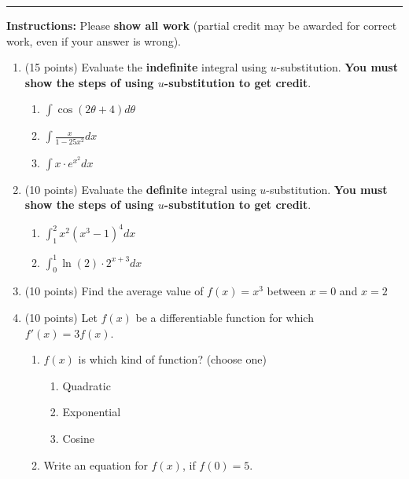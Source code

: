 \documentclass[11pt]{article}
\begin{document}
\Large


\medskip\hrule
\vspace{10pt}

\noindent \textbf{Instructions:} Please \textbf{show all work} (partial credit may be awarded for correct work, even if your answer is wrong). 

\begin{enumerate}

\item (15 points) Evaluate the \textbf{indefinite} integral using $u$-substitution. \textbf{You must show the steps of using $u$-substitution to get credit}.
\begin{enumerate}[itemsep=60pt]
    \item $\displaystyle \int \cos(2\theta+4) d\theta$
    \item $\displaystyle \int  \frac{x}{1-25x^2} dx$
    \item $\displaystyle \int x \cdot e^{x^2} dx$
\end{enumerate}

\vspace{70pt}

\item (10 points) Evaluate the \textbf{definite} integral using $u$-substitution. \textbf{You must show the steps of using $u$-substitution to get credit}.
\begin{enumerate}[itemsep=60pt]
    \item $\displaystyle \int_{1}^{2} x^2 (x^3 - 1)^4 dx$
    \item $\displaystyle \int_{0}^{1} \ln(2) \cdot 2^{x+3} dx$
\end{enumerate}

\newpage

\item (10 points) Find the average value of $f(x) = x^3$ between $x=0$ and $x=2$
\vspace{100pt}

\item (10 points) Let $f(x)$ be a differentiable function for which $f'(x)=3f(x)$.
\begin{enumerate}
    \item $f(x)$ is which kind of function? (choose one)
\begin{enumerate}
    \item Quadratic
    \item Exponential
    \item Cosine
\end{enumerate}
    \item Write an equation for $f(x)$, if $f(0)=5$.
\end{enumerate}


\end{enumerate}
\end{document}
